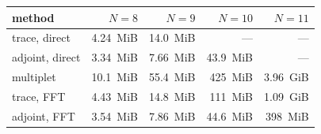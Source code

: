 \begin{center}
  \small
  \setlength{\tabcolsep}{3.2pt}
  \begin{tabular}{@{}l rrrr@{}}
  \toprule
  method & $N=8$ & $N=9$ & $N=10$ & $N=11$ \\
  \midrule
  trace, direct & \SI{4.24}{MiB} & \SI{14.0}{MiB} & --- & --- \\
  adjoint, direct & \SI{3.34}{MiB} & \SI{7.66}{MiB} & \SI{43.9}{MiB} & --- \\
  multiplet     & \SI{10.1}{MiB} & \SI{55.4}{MiB} & \SI{425}{MiB} & \SI{3.96}{GiB} \\
  trace, FFT    & \SI{4.43}{MiB} & \SI{14.8}{MiB} & \SI{111}{MiB} & \SI{1.09}{GiB} \\
  adjoint, FFT  & \SI{3.54}{MiB} & \SI{7.86}{MiB} & \SI{44.6}{MiB} & \SI{398}{MiB} \\
  \bottomrule
  \end{tabular}
\end{center}
